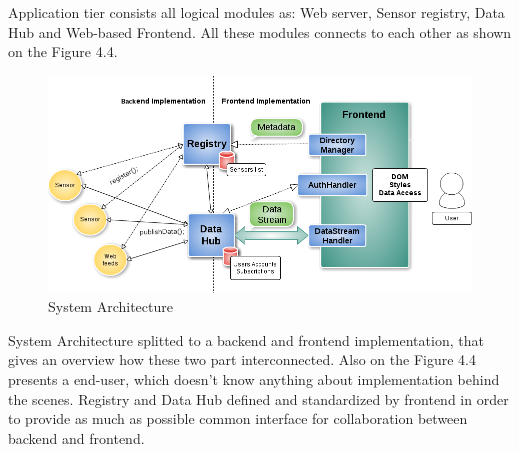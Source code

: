   Application tier consists all logical modules as: Web server, Sensor registry, Data Hub and Web-based Frontend. All these modules connects to each other as shown on the Figure 4.4. 
    \begin{figure}[!ht]
    \centering
    \includegraphics[scale=0.6]{images/Structure.png}   
    \caption[System Architecture]{System Architecture}
    \label{img:structure}                           
    \end{figure}

    System Architecture splitted to a backend and frontend implementation, that gives an overview how these two part interconnected. Also on the Figure 4.4 presents a end-user, which doesn't know anything about implementation behind the scenes. Registry and Data Hub defined and standardized by frontend in order to provide as much as possible common interface for collaboration between backend and frontend. 

